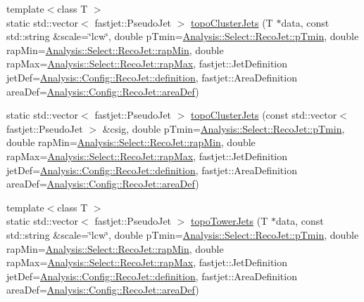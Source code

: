 \begin{DoxyCompactItemize}
\item 
{\footnotesize template$<$class T $>$ }\\static std\+::vector$<$ fastjet\+::\+Pseudo\+Jet $>$ \hyperlink{structAnalysisHelper_ac00152ad334bb568f92c0408c763a8ce}{topo\+Cluster\+Jets} (T $\ast$data, const std\+::string \&scale=\char`\"{}lcw\char`\"{}, double p\+Tmin=\hyperlink{namespaceAnalysis_1_1Select_1_1RecoJet_af7dbdbda43aa5be9d83a31fc3b41ac14}{Analysis\+::\+Select\+::\+Reco\+Jet\+::p\+Tmin}, double rap\+Min=\hyperlink{namespaceAnalysis_1_1Select_1_1RecoJet_a5e056f65c8f2f9b0ad358760fc0f4481}{Analysis\+::\+Select\+::\+Reco\+Jet\+::rap\+Min}, double rap\+Max=\hyperlink{namespaceAnalysis_1_1Select_1_1RecoJet_ada7395a2f03291db87208b68e4030d92}{Analysis\+::\+Select\+::\+Reco\+Jet\+::rap\+Max}, fastjet\+::\+Jet\+Definition jet\+Def=\hyperlink{namespaceAnalysis_1_1Config_1_1RecoJet_ae0c23bbd5e0420037cbbb9f7929da17f}{Analysis\+::\+Config\+::\+Reco\+Jet\+::definition}, fastjet\+::\+Area\+Definition area\+Def=\hyperlink{namespaceAnalysis_1_1Config_1_1RecoJet_a327f69062972ac03aac1dd7464fe778b}{Analysis\+::\+Config\+::\+Reco\+Jet\+::area\+Def})
\item 
static std\+::vector$<$ fastjet\+::\+Pseudo\+Jet $>$ \hyperlink{structAnalysisHelper_a893662e8309586c09aaf8109896fbe11}{topo\+Cluster\+Jets} (const std\+::vector$<$ fastjet\+::\+Pseudo\+Jet $>$ \&csig, double p\+Tmin=\hyperlink{namespaceAnalysis_1_1Select_1_1RecoJet_af7dbdbda43aa5be9d83a31fc3b41ac14}{Analysis\+::\+Select\+::\+Reco\+Jet\+::p\+Tmin}, double rap\+Min=\hyperlink{namespaceAnalysis_1_1Select_1_1RecoJet_a5e056f65c8f2f9b0ad358760fc0f4481}{Analysis\+::\+Select\+::\+Reco\+Jet\+::rap\+Min}, double rap\+Max=\hyperlink{namespaceAnalysis_1_1Select_1_1RecoJet_ada7395a2f03291db87208b68e4030d92}{Analysis\+::\+Select\+::\+Reco\+Jet\+::rap\+Max}, fastjet\+::\+Jet\+Definition jet\+Def=\hyperlink{namespaceAnalysis_1_1Config_1_1RecoJet_ae0c23bbd5e0420037cbbb9f7929da17f}{Analysis\+::\+Config\+::\+Reco\+Jet\+::definition}, fastjet\+::\+Area\+Definition area\+Def=\hyperlink{namespaceAnalysis_1_1Config_1_1RecoJet_a327f69062972ac03aac1dd7464fe778b}{Analysis\+::\+Config\+::\+Reco\+Jet\+::area\+Def})
\item 
{\footnotesize template$<$class T $>$ }\\static std\+::vector$<$ fastjet\+::\+Pseudo\+Jet $>$ \hyperlink{structAnalysisHelper_abefdecbf82a252f475a15879fefdf22b}{topo\+Tower\+Jets} (T $\ast$data, const std\+::string \&scale=\char`\"{}lcw\char`\"{}, double p\+Tmin=\hyperlink{namespaceAnalysis_1_1Select_1_1RecoJet_af7dbdbda43aa5be9d83a31fc3b41ac14}{Analysis\+::\+Select\+::\+Reco\+Jet\+::p\+Tmin}, double rap\+Min=\hyperlink{namespaceAnalysis_1_1Select_1_1RecoJet_a5e056f65c8f2f9b0ad358760fc0f4481}{Analysis\+::\+Select\+::\+Reco\+Jet\+::rap\+Min}, double rap\+Max=\hyperlink{namespaceAnalysis_1_1Select_1_1RecoJet_ada7395a2f03291db87208b68e4030d92}{Analysis\+::\+Select\+::\+Reco\+Jet\+::rap\+Max}, fastjet\+::\+Jet\+Definition jet\+Def=\hyperlink{namespaceAnalysis_1_1Config_1_1RecoJet_ae0c23bbd5e0420037cbbb9f7929da17f}{Analysis\+::\+Config\+::\+Reco\+Jet\+::definition}, fastjet\+::\+Area\+Definition area\+Def=\hyperlink{namespaceAnalysis_1_1Config_1_1RecoJet_a327f69062972ac03aac1dd7464fe778b}{Analysis\+::\+Config\+::\+Reco\+Jet\+::area\+Def})

\end{DoxyCompactItemize}
